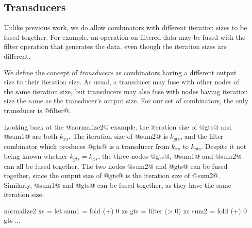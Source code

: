 


\subsection{Transducers}
Unlike previous work, we do allow combinators with different iteration sizes to be fused together.
For example, an operation on filtered data may be fused with the filter operation that generates the data, even though the iteration sizes are different.

We define the concept of \emph{transducers} as combinators having a different output size to their iteration size.
As usual, a transducer may fuse with other nodes of the same iteration size, but transducers may also fuse with nodes having iteration size the same as the transducer's output size.
For our set of combinators, the only transducer is @filter@.

Looking back at the @normalize2@ example, the iteration size of @gts@ and @sum1@ are both $k_{xs}$.
The iteration size of @sum2@ is $k_{gts}$, and the filter combinator which produces @gts@ is a transducer from $k_{xs}$ to $k_{gts}$. 
Despite it not being known whether $k_{gts} = k_{xs}$, the three nodes @gts@, @sum1@ and @sum2@ can all be fused together.
The two nodes @sum2@ and @gts@ can be fused together, since the output size of @gts@ is the iteration size of @sum2@.
Similarly, @sum1@ and @gts@ can be fused together, as they have the same iteration size.
\begin{code}
 normalize2 xs
  = let sum1 = fold   (+)  0   xs
        gts  = filter (> 0)    xs
        sum2 = fold   (+)  0   gts
        ...
\end{code}


